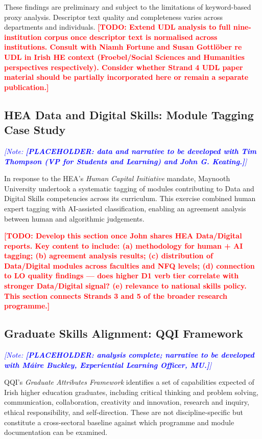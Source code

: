 \documentclass[12pt, a4paper]{article}
\newcommand{\todo}[1]{\textcolor{red}{\textbf{[TODO: #1]}}}
\newcommand{\note}[1]{\textcolor{blue}{\textit{[Note: #1]}}}
\begin{document}
These findings are preliminary and subject to the limitations of keyword-based proxy
analysis. Descriptor text quality and completeness varies across departments and
individuals. \todo{Extend UDL analysis to full nine-institution corpus once descriptor
text is normalised across institutions. Consult with Niamh Fortune and Susan Gottl{\"o}ber re UDL in Irish HE context
(Froebel/Social Sciences and Humanities perspectives respectively). Consider whether Strand 4 UDL paper
material should be partially incorporated here or remain a separate publication.}

\subsection{HEA Data and Digital Skills: Module Tagging Case Study}
\label{sec:datadigital}

\note{\textbf{[PLACEHOLDER: data and narrative to be developed with Tim Thompson (VP for Students and Learning) and John G. Keating.]}}

In response to the HEA's \textit{Human Capital Initiative} mandate, Maynooth University
undertook a systematic tagging of modules contributing to Data and Digital Skills
competencies across its curriculum. This exercise combined human expert tagging with
AI-assisted classification, enabling an agreement analysis between human and
algorithmic judgements.

\todo{Develop this section once John shares HEA Data/Digital reports. Key content to
include: (a) methodology for human + AI tagging; (b) agreement analysis results;
(c) distribution of Data/Digital modules across faculties and NFQ levels; (d) connection
to LO quality findings --- does higher D1 verb tier correlate with stronger Data/Digital
signal? (e) relevance to national skills policy. This section connects Strands 3 and 5
of the broader research programme.}

\subsection{Graduate Skills Alignment: QQI Framework}
\label{sec:skills}

\note{\textbf{[PLACEHOLDER: analysis complete; narrative to be developed with
Máire Buckley, Experiential Learning Officer, MU.]}}

QQI's \textit{Graduate Attributes Framework} \citep{qqi2022graduates} identifies
a set of capabilities expected of Irish higher education graduates, including
critical thinking and problem solving, communication, collaboration, creativity
and innovation, research and inquiry, ethical responsibility, and self-direction.
These are not discipline-specific but constitute a cross-sectoral baseline against
which programme and module documentation can be examined.
\end{document}
